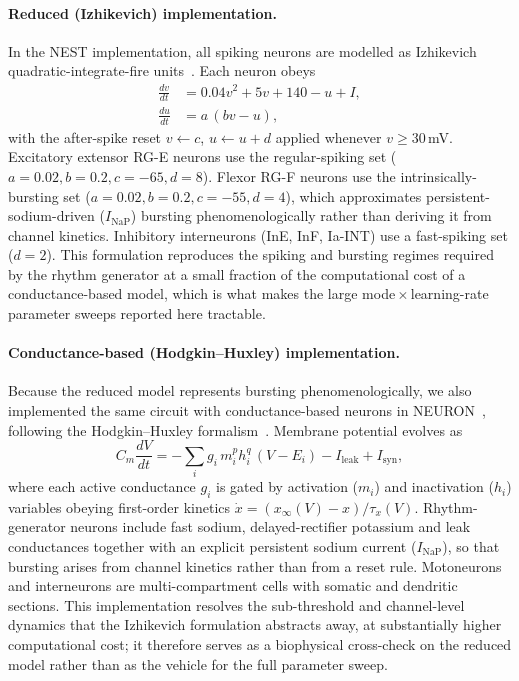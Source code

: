 \paragraph{Reduced (Izhikevich) implementation.}
In the NEST implementation, all spiking neurons are modelled as Izhikevich
quadratic-integrate-fire units~\cite{izhikevich2003}. Each neuron obeys
\begin{align}
  \frac{dv}{dt} &= 0.04v^2 + 5v + 140 - u + I, \\
  \frac{du}{dt} &= a\,(bv - u),
\end{align}
with the after-spike reset $v \leftarrow c$, $u \leftarrow u + d$ applied
whenever $v \geq 30$\,mV. Excitatory extensor RG-E neurons use the
regular-spiking set ($a=0.02, b=0.2, c=-65, d=8$). Flexor RG-F neurons use
the intrinsically-bursting set ($a=0.02, b=0.2, c=-55, d=4$), which
approximates persistent-sodium-driven ($I_\text{NaP}$) bursting
phenomenologically rather than deriving it from channel kinetics.
Inhibitory interneurons (InE, InF, Ia-INT) use a fast-spiking set
($d=2$). This formulation reproduces the spiking and bursting regimes
required by the rhythm generator at a small fraction of the computational
cost of a conductance-based model, which is what makes the large
mode\,$\times$\,learning-rate parameter sweeps reported here tractable.

\paragraph{Conductance-based (Hodgkin--Huxley) implementation.}
Because the reduced model represents bursting phenomenologically, we also
implemented the same circuit with conductance-based neurons in
NEURON~\cite{hines1997}, following the Hodgkin--Huxley
formalism~\cite{hodgkinHuxley1952}. Membrane potential evolves as
\begin{equation}
  C_m \frac{dV}{dt} = -\!\sum_i g_i\, m_i^{p}h_i^{q}\,(V - E_i) - I_\text{leak} + I_\text{syn},
  \label{eq:hh}
\end{equation}
where each active conductance $g_i$ is gated by activation ($m_i$) and
inactivation ($h_i$) variables obeying first-order kinetics
$\dot{x} = (x_\infty(V) - x)/\tau_x(V)$. Rhythm-generator neurons include
fast sodium, delayed-rectifier potassium and leak conductances together
with an explicit persistent sodium current ($I_\text{NaP}$), so that
bursting arises from channel kinetics rather than from a reset rule.
Motoneurons and interneurons are multi-compartment cells with somatic and
dendritic sections. This implementation resolves the sub-threshold and
channel-level dynamics that the Izhikevich formulation abstracts away, at
substantially higher computational cost; it therefore serves as a
biophysical cross-check on the reduced model rather than as the vehicle
for the full parameter sweep.%

